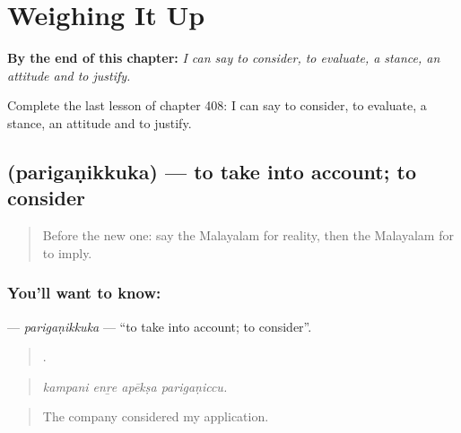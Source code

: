 
\chapter{Weighing It Up}
\label{ch:ml-weighing-it-up}

\begin{chapteropening}
\textbf{By the end of this chapter:} \emph{I can say to consider, to evaluate, a stance, an attitude and to justify.}

Complete the last lesson of chapter 408: I can say to consider, to evaluate, a stance, an attitude and to justify.
\end{chapteropening}

\section[\texorpdfstring{\ml{പരിഗണിക്കുക} (parigaṇikkuka)}{പരിഗണിക്കുക (parigaṇikkuka)}]{ (parigaṇikkuka) — to take into account; to consider}

\label{lesson:ML-C408-pariganikkuka}



\begin{quote}
Before the new one: say the Malayalam for reality, then the Malayalam for to imply.
\end{quote}

\subsection*{You'll want to know: }
\textbf{} — \emph{parigaṇikkuka} — \textquotedblleft{}to take into account; to consider\textquotedblright{}.

\begin{quote}
   .
\end{quote}

\begin{quote}
\emph{kampani enṟe apēkṣa parigaṇiccu.}
\end{quote}

\begin{quote}
The company considered my application.
\end{quote}

